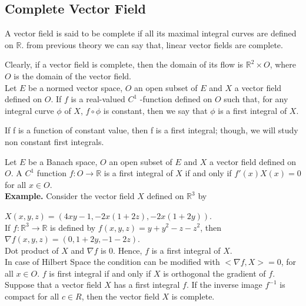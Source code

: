 \documentclass[12 pt]{article}
\theoremstyle{definition}
\theoremstyle{remark}
\newcommand{\R}{\mathbb{R}}
\begin{document}
{\subsection{Complete Vector Field}
A vector field is said to be complete if all its maximal integral curves are defined on $\R$. from previous theory we can say that, linear vector fields are complete.

Clearly, if a vector field is complete, then the domain of its flow is $\R^2 \times O$, where $O$ is the domain of the vector field.\\

Let $E$ be a normed vector space, $O$ an open subset of $E$ and $X$ a vector field defined on $O$. If $f$ is a real-valued $C^1$ -function defined on $O$ such that, for any integral curve $\phi$ of $X$, $f \circ \phi$ is constant, then we say that $\phi$ is a first integral of $X$. 

If f is a function of constant value, then f is a first integral; though, we will study non constant first integrals.

\proposition Let $E$ be a Banach space, $O$ an open subset of $E$ and $X$ a vector field defined on $O$. A $C^1$ function $f : O \to \R$ is a first integral of $X$ if and only if $f'(x) X(x) = 0$ for all $x \in O$.\\ \normalfont
\textbf{Example. } Consider the vector field $X$ defined on $\R^3$ by

\hspace*{3cm} $X(x,y,z) = (4xy - 1, -2x(1+2z), -2x(1 + 2y))$.\\

If $f : \R^3 \to \R$ is defined by $f(x,y,z) = y + y^2 - z - z^2$, then\\
\hspace*{3cm} $\nabla f(x,y,z) = (0, 1+2y, -1 -2z)$.\\

Dot product of $X$ and $\nabla f$ is 0. Hence, $f$ is a first integral of $X$.\\

In case of Hilbert Space the condition can be modified with $< \nabla f, X > = 0$, for all $x \in O$. $f$ is first integral if and only if $X$ is orthogonal the gradient of $f$.\\

\theorem Suppose that a vector field $X$ has a first integral $f$. If the inverse image $f^{-1}$ is compact for all $c \in R$, then the vector field $X$ is complete. \\

}
\end{document}
